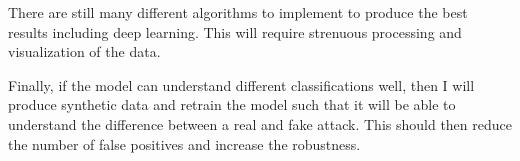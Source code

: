 \documentclass[11pt]{article}
\begin{document}
There are still many different algorithms to implement to produce the best results including deep learning. This will require strenuous processing and visualization of the data. 

Finally, if the model can understand different classifications well, then I will produce synthetic data and retrain the model such that it will be able to understand the difference between a real and fake attack. This should then reduce the number of false positives and increase the robustness. 





























\newpage


\end{document}
